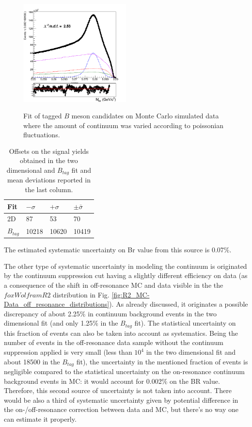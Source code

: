 \begin{figure}[h]
{\includegraphics[width=0.5\textwidth]{04-chargedCorrBtoLambda/figs/stream1_chargedBtag_Total_fit_ContinuumSys_Plus.png}}
\caption{Fit of tagged $B$ meson candidates on Monte Carlo simulated data where the amount of continuum was varied according to poissonian fluctuations.}
\label{fig:stream1_chargedBtag_Total_fit_ContinuumSys_Plus}
\end{figure}

\begin{table}[H]
\begin{tabular}{ |p{2.5cm}||p{2cm}| p{2cm}|  p{2cm}|}
\hline
    Fit    &  $- \sigma$ &  $+ \sigma$ & $ \pm \bar{\sigma}$\\
 \hline
 2D        &     87  & 53  & 70 \\
 $B_{tag}$ &  10218 &  10620 & 10419 \\
 \hline
\end{tabular}
\caption{Offsets on the signal yields obtained in the two dimensional and $B_{tag}$ fit and mean deviations reported in the last column.}
\end{table}
\vspace{0.2 cm}
\noindent The estimated systematic uncertainty on Br value from this source is 0.07$\%$.

The other type of systematic uncertainty in modeling the continuum is originated by the continuum suppression cut having a slightly different efficiency on data (as a consequence of the shift in off-resonance MC and data visible in the the $foxWolframR2$ distribution in Fig. \ref{fig:R2_MC-Data_off_resonance_distributions}). As already discussed, it originates a possible  discrepancy of about 2.25$\%$ in continuum background events in the two dimensional fit (and only 1.25$\%$  in the $B_{tag}$ fit). The statistical uncertainty on this fraction of events can also be taken into account as systematics. Being the number of events in the off-resonance data sample without the continuum suppression applied is very small (less than $10^4$ in the two dimensional fit and about 18500 in the $B_{tag}$ fit), the uncertainty in the mentioned fraction of events is negligible compared to the statistical uncertainty on the on-resonance continuum background events in MC: it would account for 0.002$\%$ on the BR value. Therefore, this second source of uncertainty is not taken into account.
There would be also a third of systematic uncertainty given by potential difference in the on-/off-resonance correction between data and MC, but there's no way one can estimate it properly.


